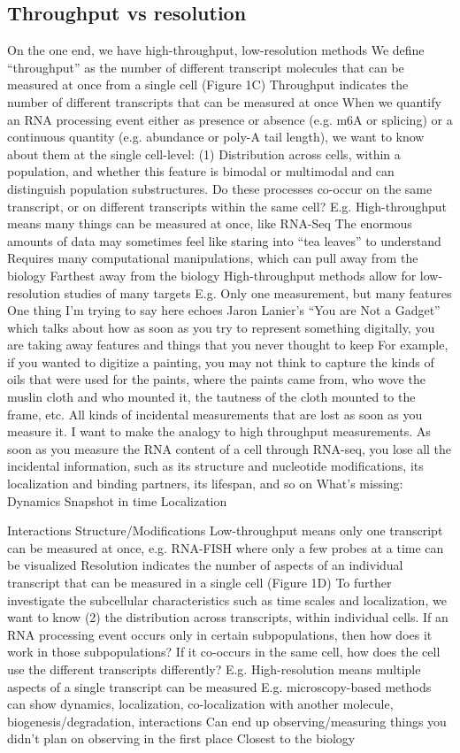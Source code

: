 \subsection{Throughput vs resolution}
On the one end, we have high-throughput, low-resolution methods
We define “throughput” as the number of different transcript molecules that can be measured at once from a single cell (Figure 1C)
Throughput indicates the number of different transcripts that can be measured at once
When we quantify an RNA processing event either as presence or absence (e.g. m6A or splicing) or a continuous quantity (e.g. abundance or poly-A tail length), we want to know about them at the single cell-level: (1) Distribution across cells, within a population, and whether this feature is bimodal or multimodal and can distinguish population substructures. Do these processes co-occur on the same transcript, or on different transcripts within the same cell?
E.g. High-throughput means many things can be measured at once, like RNA-Seq
The enormous amounts of data may sometimes feel like staring into “tea leaves” to understand
Requires many computational manipulations, which can pull away from the biology
Farthest away from the biology
High-throughput methods allow for low-resolution studies of many targets
E.g. Only one measurement, but many features
One thing I’m trying to say here echoes Jaron Lanier’s “You are Not a Gadget” which talks about how as soon as you try to represent something digitally, you are taking away features and things that you never thought to keep
For example, if you wanted to digitize a painting, you may not think to capture the kinds of oils that were used for the paints, where the paints came from, who wove the muslin cloth and who mounted it, the tautness of the cloth mounted to the frame, etc. All kinds of incidental measurements that are lost as soon as you measure it.
I want to make the analogy to high throughput measurements.
As soon as you measure the RNA content of a cell through RNA-seq, you lose all the incidental information, such as its structure and nucleotide modifications, its localization and binding partners, its lifespan, and so on
What’s missing:
Dynamics
Snapshot in time
Localization

Interactions
Structure/Modifications
Low-throughput means only one transcript can be measured at once, e.g. RNA-FISH where only a few probes at a time can be visualized
Resolution indicates the number of aspects of an individual transcript that can be measured in a single cell (Figure 1D)
To further investigate the subcellular characteristics such as time scales and localization, we want to know (2) the distribution across transcripts, within individual cells. If an RNA processing event occurs only in certain subpopulations, then how does it work in those subpopulations? If it co-occurs in the same cell, how does the cell use the different transcripts differently?
E.g. High-resolution means multiple aspects of a single transcript can be measured
E.g. microscopy-based methods can show dynamics, localization, co-localization with another molecule, biogenesis/degradation, interactions
Can end up observing/measuring things you didn’t plan on observing in the first place
Closest to the biology

